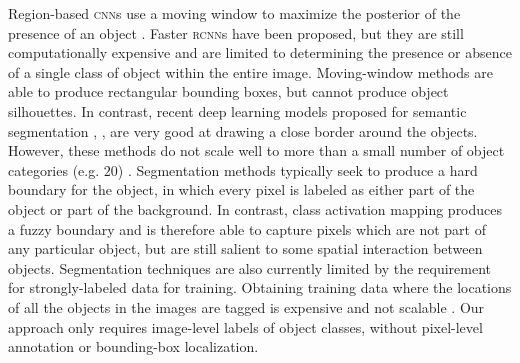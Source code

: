 Region-based \textsc{cnn}s use a moving window to maximize the posterior of the presence of an object \cite{girshick2015fast}.
Faster \textsc{rcnn}s \cite{ren2015faster} have been proposed, but they are still computationally expensive and are limited to determining the presence or absence of a single class of object within the entire image.
Moving-window methods are able to produce rectangular bounding boxes, but cannot produce object silhouettes.
In contrast, recent deep learning models proposed for semantic segmentation \cite{long2015fully}, \cite{girshick2014rich}, \cite{zheng2015conditional} are very good at drawing a close border around the objects.
However, these methods do not scale well to more than a small number of object categories (e.g. $20$) \cite{everingham2010pascal}.
Segmentation methods typically seek to produce a hard boundary for the object, in which every pixel is labeled as either part of the object or part of the background.
In contrast, class activation mapping produces a fuzzy boundary and is therefore able to capture pixels which are not part of any particular object, but are still salient to some spatial interaction between objects.
Segmentation techniques are also currently limited by the requirement for strongly-labeled data for training.
Obtaining training data where the locations of all the objects in the images are tagged is expensive and not scalable \cite{everingham2010pascal}. Our approach only requires image-level labels of object classes, without pixel-level annotation or bounding-box localization.

